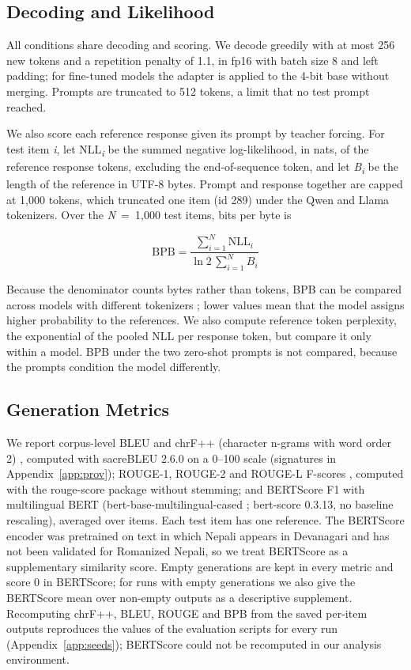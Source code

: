 \documentclass{article}
\begin{document}
\subsection{Decoding and Likelihood}\label{sec:decoding}

All conditions share decoding and scoring. We decode greedily with at most 256 new tokens and a repetition penalty of 1.1, in fp16 with batch size 8 and left padding; for fine-tuned models the adapter is applied to the 4-bit base without merging. Prompts are truncated to 512 tokens, a limit that no test prompt reached.

We also score each reference response given its prompt by teacher forcing. For test item \emph{i}, let NLL\emph{\textsubscript{i}} be the summed negative log-likelihood, in nats, of the reference response tokens, excluding the end-of-sequence token, and let \emph{B}\emph{\textsubscript{i}} be the length of the reference in UTF-8 bytes. Prompt and response together are capped at 1,000 tokens, which truncated one item (id 289) under the Qwen and Llama tokenizers. Over the \emph{N}~=~1,000 test items, bits per byte is

\begin{equation}\label{eq:bpb}
\mathrm{BPB} = \frac{\sum_{i=1}^{N} \mathrm{NLL}_i}{\ln 2 \, \sum_{i=1}^{N} B_i}
\end{equation}

Because the denominator counts bytes rather than tokens, BPB can be compared across models with different tokenizers \citep{gao2020}; lower values mean that the model assigns higher probability to the references. We also compute reference token perplexity, the exponential of the pooled NLL per response token, but compare it only within a model. BPB under the two zero-shot prompts is not compared, because the prompts condition the model differently.

\subsection{Generation Metrics}\label{sec:metrics}

We report corpus-level BLEU \citep{papineni2002} and chrF++ (character n-grams with word order 2) \citep{popovic2017}, computed with sacreBLEU 2.6.0 \citep{post2018} on a 0–100 scale (signatures in Appendix~\ref{app:prov}); ROUGE-1, ROUGE-2 and ROUGE-L F-scores \citep{lin2004}, computed with the rouge-score package without stemming; and BERTScore F1 \citep{zhang2020} with multilingual BERT (bert-base-multilingual-cased \citep{devlin2019}; bert-score 0.3.13, no baseline rescaling), averaged over items. Each test item has one reference. The BERTScore encoder was pretrained on text in which Nepali appears in Devanagari and has not been validated for Romanized Nepali, so we treat BERTScore as a supplementary similarity score. Empty generations are kept in every metric and score 0 in BERTScore; for runs with empty generations we also give the BERTScore mean over non-empty outputs as a descriptive supplement. Recomputing chrF++, BLEU, ROUGE and BPB from the saved per-item outputs reproduces the values of the evaluation scripts for every run (Appendix~\ref{app:seeds}); BERTScore could not be recomputed in our analysis environment.
\end{document}
